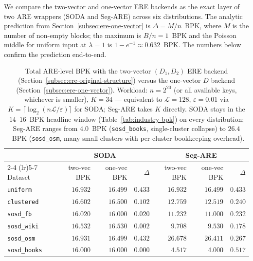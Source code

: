 We compare the two-vector and one-vector ERE backends as the exact layer
of two ARE wrappers (SODA and Seg-ARE) across six distributions.
The analytic prediction from
Section~\ref{subsec:ere-one-vector} is $\Delta = M/n$~BPK, where $M$ is
the number of non-empty blocks; the maximum is $B/n = 1$~BPK and the
Poisson middle for uniform input at $\lambda = 1$ is
$1 - e^{-1} \approx 0.632$~BPK. The numbers below confirm the prediction
end-to-end.

\begin{table}[H]
    \centering
    \setlength{\tabcolsep}{5pt}
    \small
    \begin{tabular}{@{}lrrrrrr@{}}
        \toprule
        & \multicolumn{3}{c}{SODA} & \multicolumn{3}{c}{Seg-ARE} \\
        \cmidrule(lr){2-4} \cmidrule(lr){5-7}
        Dataset
        & two-vec BPK & one-vec BPK & $\Delta$
        & two-vec BPK & one-vec BPK & $\Delta$ \\
        \midrule
        \texttt{uniform}     & $16.932$ & $16.499$ & $0.433$ & $16.932$ & $16.499$ & $0.433$ \\
        \texttt{clustered}   & $16.602$ & $16.500$ & $0.102$ & $12.759$ & $12.519$ & $0.240$ \\
        \texttt{sosd\_fb}    & $16.020$ & $16.000$ & $0.020$ & $11.232$ & $11.000$ & $0.232$ \\
        \texttt{sosd\_wiki}  & $16.532$ & $16.530$ & $0.002$ & $9.708$  & $9.530$  & $0.178$ \\
        \texttt{sosd\_osm}   & $16.931$ & $16.499$ & $0.432$ & $26.678$ & $26.411$ & $0.267$ \\
        \texttt{sosd\_books} & $16.000$ & $16.000$ & $0.000$ & $4.517$  & $4.000$  & $0.517$ \\
        \bottomrule
    \end{tabular}
    \caption{Total ARE-level BPK with the two-vector $(D_1, D_2)$ ERE backend
        (Section~\ref{subsec:ere-original-structure}) versus the one-vector $D$
        backend (Section~\ref{subsec:ere-one-vector}). Workload: $n = 2^{20}$
        (or all available keys, whichever is smaller), $K = 34$ — equivalent to
        $\mathcal{L} = 128$, $\varepsilon = 0.01$ via $K = \lceil \log_2(n\mathcal{L}/\varepsilon) \rceil$
        for SODA; Seg-ARE takes $K$ directly. SODA stays in the
        $14$--$16$~BPK headline window (Table~\ref{tab:industry-bpk}) on every
        distribution; Seg-ARE ranges from $4.0$~BPK (\texttt{sosd\_books},
        single-cluster collapse) to $26.4$~BPK (\texttt{sosd\_osm}, many small
        clusters with per-cluster bookkeeping overhead).}
    \label{tab:ere-backend-cross-distribution}
\end{table}

